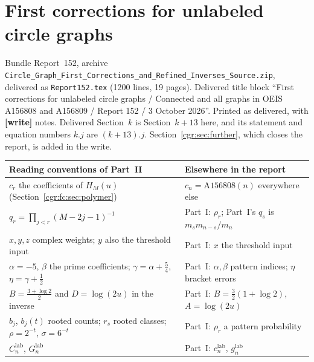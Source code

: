 \documentclass[11pt,letterpaper]{article}
\numberwithin{equation}{section}
\theoremstyle{definition}\newtheorem{definition}[theorem]{Definition}
\theoremstyle{remark}\newtheorem{remark}[theorem]{Remark}
\newcommand{\file}[1]{\nolinkurl{#1}}
\newcommand{\partsource}[1]{\par\noindent\begin{minipage}{\textwidth}\small #1\end{minipage}\par\medskip}
\begin{document}
\clearpage
\part{First corrections for unlabeled circle graphs}\label{cgr:fc:part}
\partsource{Bundle Report~152, archive \file{Circle_Graph_First_Corrections_and_Refined_Inverses_Source.zip}, delivered as \file{Report152.tex} (1200 lines, 19 pages). Delivered title block ``First corrections for unlabeled circle graphs / Connected and all graphs in OEIS A156808 and A156809 / Report 152 / 3 October 2026''. Printed as delivered, with \textbf{[write]} notes. Delivered Section~$k$ is Section~$k+13$ here, and its statement and equation numbers $k.j$ are $(k+13).j$. Section~\ref{cgr:sec:further}, which closes the report, is added in the write.}
\begin{center}
\small
\begin{tabular}{@{}>{\raggedright\arraybackslash}p{} >{\raggedright\arraybackslash}p{}@{}}
\toprule
Reading conventions of Part~II & Elsewhere in the report\\
\midrule
$c_r$ the coefficients of $H_M(u)$ (Section~\ref{cgr:fc:sec:polymer}) & $c_n=\mathrm{A156808}(n)$ everywhere else\\
$q_r=\prod_{j<r}(M-2j-1)^{-1}$ & Part~I: $\rho_r$; Part~I's $q_s$ is $m_sm_{n-s}/m_n$\\
$x,y,z$ complex weights; $y$ also the threshold input & Part~I: $x$ the threshold input\\
$\alpha=-5$, $\beta$ the prime coefficients; $\gamma=\alpha+\frac54$, $\eta=\gamma+\frac12$ & Part~I: $\alpha,\beta$ pattern indices; $\eta$ bracket errors\\
$B=\frac{3+\log2}2$ and $D=\log(2u)$ in the inverse & Part~I: $B=\frac32(1+\log2)$, $A=\log(2u)$\\
$b_j$, $b_j(t)$ rooted counts; $r_s$ rooted classes; $\rho=2^{-t}$, $\sigma=6^{-t}$ & Part~I: $\rho_r$ a pattern probability\\
$C_n^{\mathrm{lab}}$, $G_n^{\mathrm{lab}}$ & Part~I: $c_n^{\mathrm{lab}}$, $g_n^{\mathrm{lab}}$\\
\bottomrule
\end{tabular}
\end{center}
\end{document}

